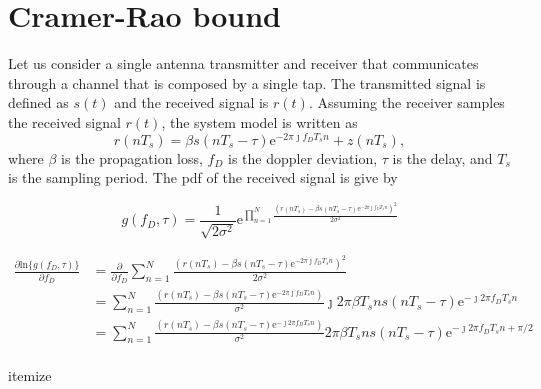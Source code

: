 \documentclass[12pt,a4paper,twoside,english]{article}
\begin{document}
	
\section{Cramer-Rao bound}	
	Let us consider a single antenna transmitter and receiver that communicates through a channel that is composed by a single tap. The transmitted signal is defined as $s(t)$ and the received signal is $r(t)$. Assuming the receiver samples the received signal $r(t)$, the system model is written as
	\begin{equation}
		r(nT_s) = \beta s(nT_s - \tau)\textrm{e}^{-2\pi \jmath f_DT_s n} + z(nT_s),
	\end{equation}
where $\beta$ is the propagation loss, $f_D$ is the doppler deviation, $\tau$ is the delay, and $T_s$ is the sampling period. The pdf of the received signal is give by

\begin{equation}
  g(f_D,\tau) = \frac{1}{\sqrt{2\sigma ^2}}\textrm{e}^{\prod_{n=1}^{N}\frac{\left(r(nT_s) - \beta s(nT_s - \tau)\textrm{e}^{-2\pi \jmath f_DT_s n}\right)^2}{2\sigma^2}}
\end{equation}



\begin{align}
 \frac{\partial \textrm{ln}\{g(f_D,\tau)\} }{\partial  f_D} & = \frac{\partial }{\partial  f_D} \sum_{n=1}^{N}\frac{\left(r(nT_s) - \beta s(nT_s - \tau)\textrm{e}^{-2\pi \jmath f_DT_s n}\right)^2}{2\sigma^2} \\
 & = \sum_{n=1}^{N}\frac{\left(r(nT_s) - \beta s(nT_s - \tau)\textrm{e}^{-2\pi \jmath f_DT_s n}\right)}{\sigma^2} \jmath 2\pi \beta T_s n s(nT_s - \tau)\textrm{e}^{-\jmath 2\pi f_DT_s n} \\
  & = \sum_{n=1}^{N}\frac{\left(r(nT_s) - \beta s(nT_s - \tau)\textrm{e}^{-\jmath 2\pi f_DT_s n}\right)}{\sigma^2} 2\pi \beta T_s n s(nT_s - \tau)\textrm{e}^{-\jmath 2\pi f_DT_s n + \pi/2} \\
\end{align}
   
itemize     




 	
\end{document}
